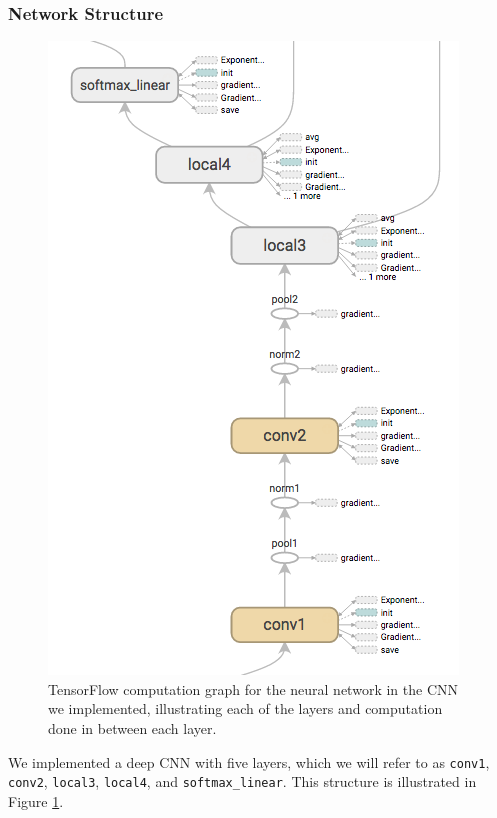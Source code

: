 \documentclass[10pt, twocolumn, twoside]{article}
\begin{document}
\subsubsection{Network Structure}

\begin{figure}[!htbp]
	\centering
	\includegraphics[width=\linewidth]{inference_graph}
	\caption{TensorFlow computation graph for the neural network in the CNN we implemented, illustrating each of the layers and computation done in between each layer.}
	\label{fig:inference}
\end{figure}

We implemented a deep CNN with five layers, which we will refer to as \texttt{conv1}, \texttt{conv2}, \texttt{local3}, \texttt{local4}, and \texttt{softmax\_linear}. This structure is illustrated in Figure \ref{fig:inference}. 
\end{document}
